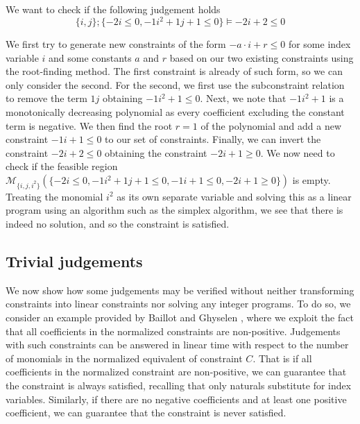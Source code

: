 \begin{example}
    We want to check if the following judgement holds
    $$\{i, j\}; \{-2i \leq 0, -1i^2 + 1j + 1 \leq 0\} \vDash -2i + 2 \leq 0$$
    
    
    We first try to generate new constraints of the form $-a \cdot i + r \leq 0$ for some index variable $i$ and some constants $a$ and $r$ based on our two existing constraints using the root-finding method. The first constraint is already of such form, so we can only consider the second. For the second, we first use the subconstraint relation to remove the term $1j$ obtaining $-1i^2 + 1 \leq 0$. Next, we note that $-1i^2 + 1$ is a monotonically decreasing polynomial as every coefficient excluding the constant term is negative. We then find the root $r = 1$ of the polynomial and add a new constraint $-1i + 1 \leq 0$ to our set of constraints. Finally, we can invert the constraint $-2i + 2 \leq 0$ obtaining the constraint $-2i + 1 \geq 0$. We now need to check if the feasible region $\mathcal{M}_{\{i, j, i^2\}}(\{-2i \leq 0, -1i^2 + 1j + 1 \leq 0, -1i + 1 \leq 0, -2i + 1 \geq 0\})$ is empty. Treating the monomial $i^2$ as its own separate variable and solving this as a linear program using an algorithm such as the simplex algorithm, we see that there is indeed no solution, and so the constraint is satisfied. 
\end{example}

\subsection{Trivial judgements}
We now show how some judgements may be verified without neither transforming constraints into linear constraints nor solving any integer programs. To do so, we consider an example provided by Baillot and Ghyselen \cite{BaillotGhyselen2021}, where we exploit the fact that all coefficients in the normalized constraints are non-positive. Judgements with such constraints can be answered in linear time with respect to the number of monomials in the normalized equivalent of constraint $C$. That is if all coefficients in the normalized constraint are non-positive, we can guarantee that the constraint is always satisfied, recalling that only naturals substitute for index variables. Similarly, if there are no negative coefficients and at least one positive coefficient, we can guarantee that the constraint is never satisfied.\\

